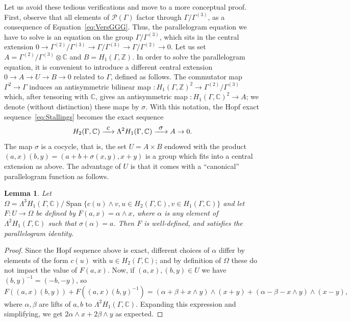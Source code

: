 \documentclass[JEP,XML,SOM,Unicode,NoEqCountersInSection]{cedram}
\let\mathcal\mathscr
\def\To#1{\mathchoice{\xrightarrow{\textstyle\kern4pt#1\kern3pt}}{\stackrel{#1}{\longrightarrow}}{}{}}
\newtheorem{lemma}[theorem]{Lemma}
\theoremstyle{definition}
\newcommand{\ZZ}{\mathbb{Z}}
\newcommand{\CC}{\mathbb{C}}
\begin{document}
Let us avoid these tedious verifications and move to a more conceptual proof.
First, observe that all elements of $\mathcal{P}(\Gamma)$ factor through
$\Gamma/\Gamma^{(3)}$, as a consequence of Equation~\eqref{eq:VersGGG}.
Thus, the parallelogram equation we have to solve is an equation on the
group $\Gamma/\Gamma^{(3)}$, which sits in the central extension
$0\to\Gamma^{(2)}/\Gamma^{(3)}\to\Gamma/\Gamma^{(3)}
\to\Gamma/\Gamma^{(2)}\to 0$.
Let us set $A=\Gamma^{(2)}/\Gamma^{(3)}\otimes\CC$ and $B=H_1(\Gamma,\ZZ)$.
In order to solve the parallelogram equation, it is convenient to introduce
a different central extension $0\to A\to U\to B\to 0$ related to $\Gamma$,
defined as follows. The commutator map $\Gamma^2\to \Gamma$ induces an
antisymmetric bilinear map
$\colon H_1(\Gamma,\ZZ)^2\to \Gamma^{(2)}/\Gamma^{(3)}$
which, after tensoring with $\CC$, gives an antisymmetric map
$\colon H_1(\Gamma,\CC)^2\to A$; we denote (without distinction) these maps
by $\sigma$. With this notation, the Hopf exact
sequence~\eqref{eq:Stallings} becomes the exact sequence
\[
H_2(\Gamma,\CC)\To{c}\Lambda^2H_1(\Gamma,\CC) \To{\sigma} A\to 0.
\]
The map $\sigma$ is a cocycle, that is, the set $U=A\times B$ endowed with
the product $(a,x)(b,y)=(a+b+\sigma(x,y),x+y)$ is a group which fits into
a central extension as above. The advantage of $U$ is that it comes with a
``canonical'' parallelogram function as follows.
\begin{lemma}
Let $\Omega=\Lambda^3 H_1(\Gamma,\CC)/\operatorname{Span}\lbrace
c(u)\wedge v, u\in H_2(\Gamma,\CC),v\in H_1(\Gamma,\CC)\rbrace$
and let $F\colon U\to \Omega$ be defined by $F(a,x)=\alpha\wedge x$,
where $\alpha$ is any element of $\Lambda^2H_1(\Gamma,\CC)$ such that
$\sigma(\alpha)=a$.
Then $F$ is well-defined, and satisfies the parallelogram identity.
\end{lemma}

\begin{proof}
Since the Hopf sequence above is exact, different choices of $\alpha$
differ by elements of the form $c(u)$ with $u\in H_2(\Gamma,\CC)$;
and by definition of $\Omega$ these do not impact the value of $F(a,x)$.
Now, if $(a,x),(b,y)\in U$ we have $(b,y)^{-1}=(-b,-y)$, so
\[F((a,x)(b,y))+F((a,x)(b,y)^{-1})=(\alpha+\beta+x\wedge y)\wedge(x+y) +
(\alpha-\beta-x\wedge y)\wedge (x-y), \]
where $\alpha,\beta$ are lifts of $a,b$ to $\Lambda^2H_1(\Gamma,\CC)$.
Expanding this expression and simplifying, we get
$2\alpha\wedge x+2\beta\wedge y$ as expected.
\end{proof}
\end{document}
